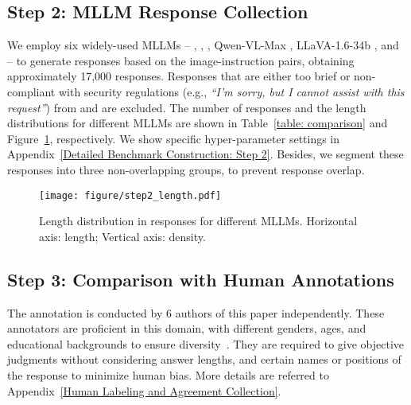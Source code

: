 \subsection{Step 2: MLLM Response Collection}

We employ six widely-used MLLMs –  \citep{openai2023gpt4v},  \citep{geminiteam2023gemini},  \citep{liu2023llava}, Qwen-VL-Max \citep{Qwen-VL}, LLaVA-1.6-34b \citep{liu2023llava}, and  \citep{wang2023cogvlm} – to generate responses based on the image-instruction pairs, obtaining approximately 17,000 responses. 
Responses that are either too brief or non-compliant with security regulations (e.g., \textit{``I'm sorry, but I cannot assist with this request''}) from  and  are excluded. 
The number of responses and the length distributions for different MLLMs are shown in Table~\ref{table: comparison} and Figure~\ref{fig:length_distribution}, respectively. 
We show specific hyper-parameter settings in Appendix~\ref{Detailed Benchmark Construction: Step 2}. Besides, we segment these responses into three non-overlapping groups, to prevent response overlap. 

\begin{figure}[t]
    \centering
    \texttt{[image: figure/step2\_length.pdf]}
    \vspace{-15pt}
    \caption{Length distribution in responses for different MLLMs. Horizontal axis: length; Vertical axis: density.}
    \label{fig:length_distribution}
    \vspace{-10pt}
\end{figure}

\subsection{Step 3: Comparison with Human Annotations}
The annotation is conducted by 6 authors of this paper independently. These annotators are proficient in this domain, with different genders, ages, and educational backgrounds to ensure diversity~\citep{sun2020evolution}. They are required to give objective judgments without considering answer lengths, and certain names or positions of the response to minimize human bias. More details are referred to Appendix~\ref{Human Labeling and Agreement Collection}.

